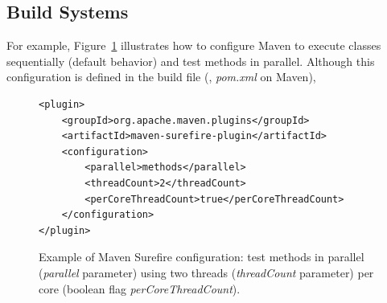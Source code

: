 


\subsection{Build Systems}


 For example, Figure~\ref{fig:surefire} illustrates how to
configure Maven to execute classes sequentially (default behavior) and
test methods in parallel. Although this configuration is defined in
the build file (\eg, \emph{pom.xml} on Maven), 

\begin{figure}[h!]
\centering
\scriptsize
{}
\begin{lstlisting}
<plugin>
    <groupId>org.apache.maven.plugins</groupId>
    <artifactId>maven-surefire-plugin</artifactId>
    <configuration>
        <parallel>methods</parallel>
        <threadCount>2</threadCount>
        <perCoreThreadCount>true</perCoreThreadCount>
    </configuration>
</plugin>
\end{lstlisting}
\caption{\label{fig:surefire} Example of Maven Surefire configuration:
    test methods in parallel (\emph{parallel} parameter) using two
    threads (\emph{threadCount} parameter) per core (boolean flag
    \emph{perCoreThreadCount}).}
\end{figure}

